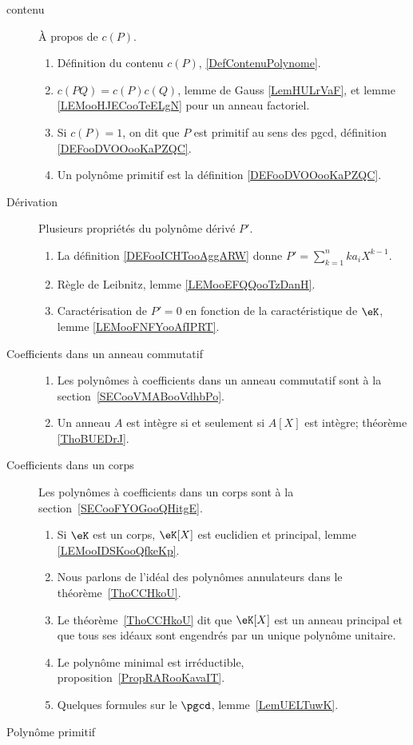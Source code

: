 \begin{description}
	\item[contenu]
		À propos de \( c(P)\).
		\begin{enumerate}
			\item Définition du contenu \( c(P)\), \ref{DefContenuPolynome}.
			\item
			      \( c(PQ)=c(P)c(Q)\), lemme de Gauss \ref{LemHULrVaF}, et lemme \ref{LEMooHJECooTeELgN} pour un anneau factoriel.
			\item
			      Si \( c(P)=1\), on dit que \( P\) est primitif au sens des pgcd, définition \ref{DEFooDVOOooKaPZQC}.
			\item
			      Un polynôme primitif est la définition \ref{DEFooDVOOooKaPZQC}.
		\end{enumerate}

	\item[Dérivation]
		Plusieurs propriétés du polynôme dérivé \( P'\).
		\begin{enumerate}
			\item
			      La définition \ref{DEFooICHTooAggARW} donne \( P'=\sum_{k=1}^nka_iX^{k-1}\).
			\item
			      Règle de Leibnitz, lemme \ref{LEMooEFQQooTzDanH}.
			\item
			      Caractérisation de \( P'=0\) en fonction de la caractéristique de \( \eK\), lemme \ref{LEMooFNFYooAfIPRT}.
		\end{enumerate}

	\item[Coefficients dans un anneau commutatif]

		\begin{enumerate}
			\item
			      Les polynômes à coefficients dans un anneau commutatif  sont à la section~\ref{SECooVMABooVdhbPo}.
			\item
			      Un anneau \( A\) est intègre si et seulement si \( A[X]\) est intègre; théorème \ref{ThoBUEDrJ}.
		\end{enumerate}


	\item[Coefficients dans un corps]
		Les polynômes à coefficients dans un corps sont à la section~\ref{SECooFYOGooQHitgE}.
		\begin{enumerate}
			\item
			      Si \( \eK\) est un corps, \( \eK[X]\) est euclidien et principal, lemme \ref{LEMooIDSKooQfkeKp}.
			\item
			      Nous parlons de l'idéal des polynômes annulateurs dans le théorème~\ref{ThoCCHkoU}.
			\item
			      Le théorème~\ref{ThoCCHkoU} dit que \( \eK[X]\) est un anneau principal et que tous ses idéaux sont engendrés par un unique polynôme unitaire.
			\item
			      Le polynôme minimal est irréductible, proposition~\ref{PropRARooKavaIT}.
			\item
			      Quelques formules sur le \( \pgcd\), lemme~\ref{LemUELTuwK}.
		\end{enumerate}
	\item[Polynôme primitif]


\end{description}
